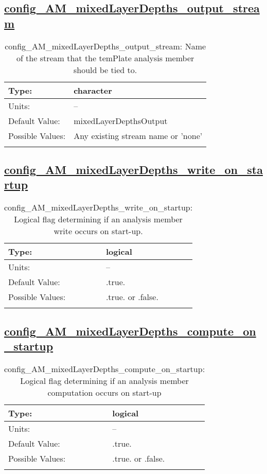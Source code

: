 \subsection[config\_AM\_mixedLayerDepths\_output\_stream]{\hyperref[sec:nm_tab_AM_mixedLayerDepths]{config\_AM\_mixedLayerDepths\_output\_stream}}
\label{subsec:nm_sec_config_AM_mixedLayerDepths_output_stream}
\begin{center}
\begin{longtable}{| p{2.0in} || p{4.0in} |}
    \hline
    Type: & character \\
    \hline
    Units: & -- \\
    \hline
    Default Value: & mixedLayerDepthsOutput \\
    \hline
    Possible Values: & Any existing stream name or 'none' \\
    \hline
    \caption{config\_AM\_mixedLayerDepths\_output\_stream: Name of the stream that the temPlate analysis member should be tied to.}
\end{longtable}
\end{center}
\subsection[config\_AM\_mixedLayerDepths\_write\_on\_startup]{\hyperref[sec:nm_tab_AM_mixedLayerDepths]{config\_AM\_mixedLayerDepths\_write\_on\_startup}}
\label{subsec:nm_sec_config_AM_mixedLayerDepths_write_on_startup}
\begin{center}
\begin{longtable}{| p{2.0in} || p{4.0in} |}
    \hline
    Type: & logical \\
    \hline
    Units: & -- \\
    \hline
    Default Value: & .true. \\
    \hline
    Possible Values: & .true. or .false. \\
    \hline
    \caption{config\_AM\_mixedLayerDepths\_write\_on\_startup: Logical flag determining if an analysis member write occurs on start-up.}
\end{longtable}
\end{center}
\subsection[config\_AM\_mixedLayerDepths\_compute\_on\_startup]{\hyperref[sec:nm_tab_AM_mixedLayerDepths]{config\_AM\_mixedLayerDepths\_compute\_on\_startup}}
\label{subsec:nm_sec_config_AM_mixedLayerDepths_compute_on_startup}
\begin{center}
\begin{longtable}{| p{2.0in} || p{4.0in} |}
    \hline
    Type: & logical \\
    \hline
    Units: & -- \\
    \hline
    Default Value: & .true. \\
    \hline
    Possible Values: & .true. or .false. \\
    \hline
    \caption{config\_AM\_mixedLayerDepths\_compute\_on\_startup: Logical flag determining if an analysis member computation occurs on start-up}
\end{longtable}
\end{center}
